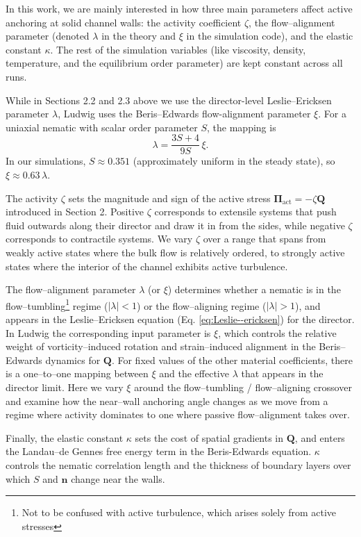 \documentclass[11pt]{article}
\begin{document}
In this work, we are mainly interested in how three main parameters affect active anchoring at solid channel walls: the activity coefficient $\zeta$, the flow–alignment parameter (denoted $\lambda$ in the theory and $\xi$ in the simulation code), and the elastic constant $\kappa$. The rest of the simulation variables (like viscosity, density, temperature, and the equilibrium order parameter) are kept constant across all runs.

While in Sections 2.2 and 2.3 above we use the director-level Leslie--Ericksen parameter $\lambda$, Ludwig uses the Beris--Edwards flow-alignment parameter $\xi$. For a uniaxial nematic with scalar order parameter $S$, the mapping is
\begin{equation}
\lambda = \frac{3S+4}{9S}\,\xi.
\label{eq:lambda_xi_map}
\end{equation}
In our simulations, $S \approx 0.351$ (approximately uniform in the steady state), so $\xi \approx 0.63\,\lambda.$

\pagebreak
The activity $\zeta$ sets the magnitude and sign of the active stress $\boldsymbol{\Pi}_{\mathrm{act}} = -\zeta \mathbf{Q}$ introduced in Section 2. Positive $\zeta$ corresponds to extensile systems that push fluid outwards along their director and draw it in from the sides, while negative $\zeta$ corresponds to contractile systems. We vary $\zeta$ over a range that spans from weakly active states where the bulk flow is relatively ordered, to strongly active states where the interior of the channel exhibits active turbulence. 

The flow–alignment parameter $\lambda$ (or $\xi$) determines whether a nematic is in the flow–tumbling\footnote{Not to be confused with active turbulence, which arises solely from active stresses} regime ($|\lambda|<1$) or the flow–aligning regime ($|\lambda|>1$), and appears in the Leslie–Ericksen equation (Eq. \eqref{eq:Leslie--ericksen}) for the director. In Ludwig the corresponding input parameter is $\xi$, which controls the relative weight of vorticity–induced rotation and strain–induced alignment in the Beris–Edwards dynamics for $\mathbf{Q}$. For fixed values of the other material coefficients, there is a one–to–one mapping between $\xi$ and the effective $\lambda$ that appears in the director limit. Here we vary $\xi$ around the flow–tumbling / flow–aligning crossover and examine how the near–wall anchoring angle changes as we move from a regime where activity dominates to one where passive flow–alignment takes over.

Finally, the elastic constant $\kappa$ sets the cost of spatial gradients in $\mathbf{Q}$, and enters the Landau--de Gennes free energy term in the Beris-Edwards equation. $\kappa$ controls the nematic correlation length and the thickness of boundary layers over which $S$ and $\mathbf{n}$ change near the walls. 
\end{document}
